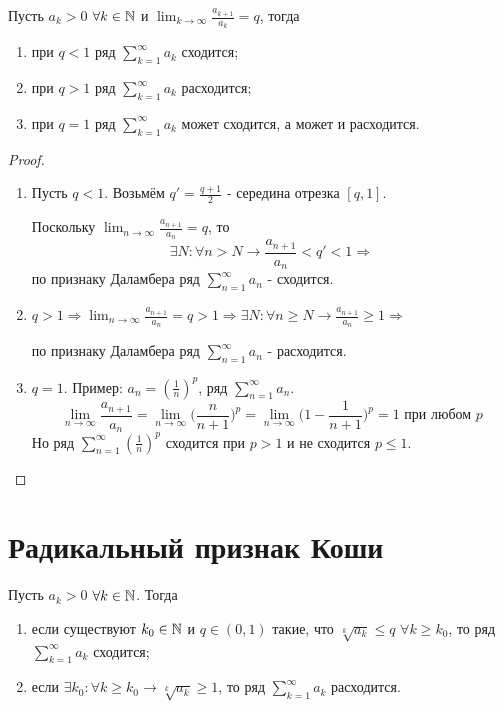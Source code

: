 	\begin{corollary}
		Пусть $a_k > 0$ $\forall k \in \mathbb N$ и $\displaystyle \lim_{k \to \infty} {\frac{a_{k + 1}}{a_k}} = q$, тогда
		
		\begin{enumerate}
			\item при $q < 1$ ряд $\displaystyle \sum_{k = 1}^{\infty} {a_k}$ сходится;
			\item при $q > 1$ ряд $\displaystyle \sum_{k = 1}^{\infty} {a_k}$ расходится;
			\item при $q = 1$ ряд $\displaystyle \sum_{k = 1}^{\infty} {a_k}$ может сходится, а может и расходится.
		\end{enumerate}
	\end{corollary}
	
	\begin{proof}
		\begin{enumerate}
			\item Пусть $q < 1$. Возьмём $q' = \frac{q + 1}{2}$ - середина отрезка $[q, 1]$.
			
			Поскольку $\lim_{n \to \infty} \frac{a_{n + 1}}{a_n} = q$, то 
			\[ \exists N: \forall n > N \rightarrow \frac{a_{n + 1}}{a_n} < q' < 1 \Rightarrow \]
			по признаку Даламбера ряд $\sum_{n = 1}^{\infty} a_n$ - сходится.
			
			\item $q > 1 \Rightarrow \lim_{n \to \infty} \frac{a_{n + 1}}{a_n} = q > 1 \Rightarrow \exists N: \forall n \geqslant N \rightarrow \frac{a_{n + 1}}{a_n} \geqslant 1 \Rightarrow$
			
			по признаку Даламбера ряд $\sum_{n = 1}^{\infty} a_n$ - расходится.
			
			\item $q = 1$. Пример: $a_n = (\frac{1}{n})^p$, ряд $\sum_{n = 1}^{\infty} a_n$.
			\[ \lim_{n \to \infty} \frac{a_{n + 1}}{a_n} = \lim_{n \to \infty} \bigg(\frac{n}{n + 1}\bigg)^p = \lim_{n \to \infty} \bigg(1 - \frac{1}{n + 1}\bigg)^p = 1 \text{ при любом } p \]
			Но ряд $\sum_{n = 1}^{\infty} (\frac{1}{n})^p$ сходится при $p > 1$ и не сходится $p \leqslant 1$.
		\end{enumerate}
	\end{proof}
	
	\section{Радикальный признак Коши}
	
	\begin{theorem}
		Пусть $a_k > 0$ $\forall k \in \mathbb N$. Тогда
		\begin{enumerate}
			\item если существуют $k_0 \in \mathbb N$ и $q \in (0, 1)$ такие, что $\sqrt[k]{a_k} \leqslant q$ $\forall k \geqslant k_0$, то ряд $\displaystyle \sum_{k = 1}^{\infty} {a_k}$ сходится;
			\item если $\exists k_0: \forall k \geqslant k_0 \rightarrow \sqrt[k]{a_k} \geqslant 1$, то ряд $\displaystyle \sum_{k = 1}^{\infty} {a_k}$ расходится.
		\end{enumerate}
	\end{theorem}
	
